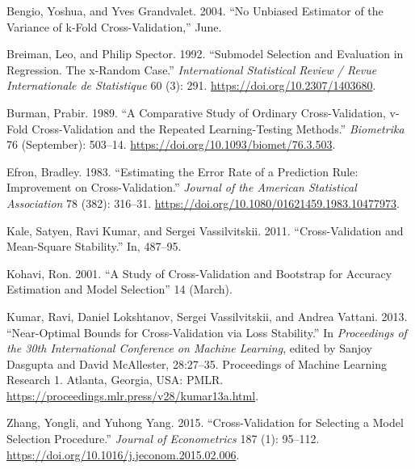 \documentclass[
  12pt,
]{article}
\newlength{\cslhangindent}
\newlength{\cslentryspacingunit} %
\newenvironment{CSLReferences}[2] %
 {%
  \setlength{\parindent}{0pt}
  \ifodd #1
  \let\oldpar\par
  \def\par{\hangindent=\cslhangindent\oldpar}
  \fi
  \setlength{\parskip}{#2\cslentryspacingunit}
 }%
 {}
\begin{document}
\hypertarget{refs}{}
\begin{CSLReferences}{1}{0}
\leavevmode{}%
Bengio, Yoshua, and Yves Grandvalet. 2004. {``No Unbiased Estimator of
the Variance of k-Fold Cross-Validation,''} June.

\leavevmode{}%
Breiman, Leo, and Philip Spector. 1992. {``Submodel Selection and
Evaluation in Regression. The x-Random Case.''} \emph{International
Statistical Review / Revue Internationale de Statistique} 60 (3): 291.
\url{https://doi.org/10.2307/1403680}.

\leavevmode{}%
Burman, Prabir. 1989. {``A Comparative Study of Ordinary
Cross-Validation, v-Fold Cross-Validation and the Repeated
Learning-Testing Methods.''} \emph{Biometrika} 76 (September): 503--14.
\url{https://doi.org/10.1093/biomet/76.3.503}.

\leavevmode{}%
Efron, Bradley. 1983. {``Estimating the Error Rate of a Prediction Rule:
Improvement on Cross-Validation.''} \emph{Journal of the American
Statistical Association} 78 (382): 316--31.
\url{https://doi.org/10.1080/01621459.1983.10477973}.

\leavevmode{}%
Kale, Satyen, Ravi Kumar, and Sergei Vassilvitskii. 2011.
{``Cross-Validation and Mean-Square Stability.''} In, 487--95.

\leavevmode{}%
Kohavi, Ron. 2001. {``A Study of Cross-Validation and Bootstrap for
Accuracy Estimation and Model Selection''} 14 (March).

\leavevmode{}%
Kumar, Ravi, Daniel Lokshtanov, Sergei Vassilvitskii, and Andrea
Vattani. 2013. {``Near-Optimal Bounds for Cross-Validation via Loss
Stability.''} In \emph{Proceedings of the 30th International Conference
on Machine Learning}, edited by Sanjoy Dasgupta and David McAllester,
28:27--35. Proceedings of Machine Learning Research 1. Atlanta, Georgia,
USA: PMLR. \url{https://proceedings.mlr.press/v28/kumar13a.html}.

\leavevmode{}%
Zhang, Yongli, and Yuhong Yang. 2015. {``Cross-Validation for Selecting
a Model Selection Procedure.''} \emph{Journal of Econometrics} 187 (1):
95--112. \url{https://doi.org/10.1016/j.jeconom.2015.02.006}.

\end{CSLReferences}
\end{document}
